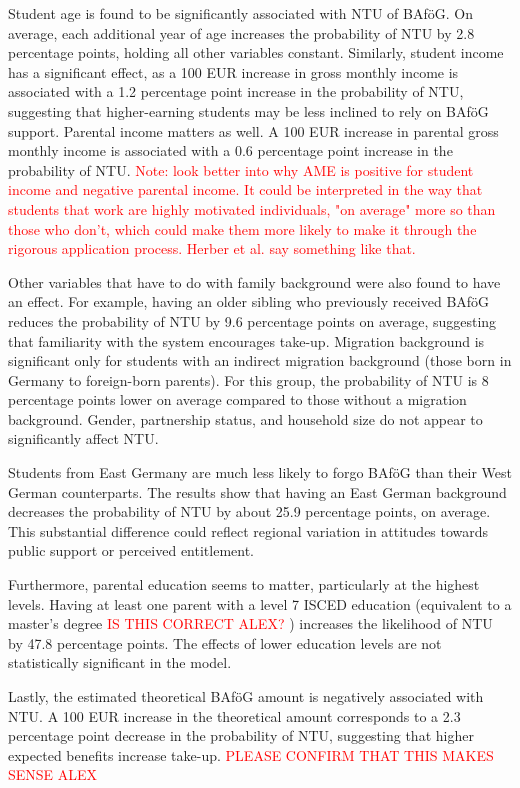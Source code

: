 Student age is found to be significantly associated with NTU of BAföG. On average, each additional year of age increases the probability of NTU by 2.8 percentage points, holding all other variables constant. Similarly, student income has a significant effect, as a 100 EUR increase in gross monthly income is associated with a 1.2 percentage point increase in the probability of NTU, suggesting that higher-earning students may be less inclined to rely on BAföG support. Parental income matters as well. A 100 EUR increase in parental gross monthly income is associated with a 0.6 percentage point increase in the probability of NTU. \textcolor{red}{Note: look better into why AME is positive for student income and negative parental income. It could be interpreted in the way that students that work are highly motivated individuals, "on average" more so than those who don't, which could make them more likely to make it through the rigorous application process. Herber et al. say something like that.}

Other variables that have to do with family background were also found to have an effect. For example, having an older sibling who previously received BAföG reduces the probability of NTU by 9.6 percentage points on average, suggesting that familiarity with the system encourages take-up. Migration background is significant only for students with an indirect migration background (those born in Germany to foreign-born parents). For this group, the probability of NTU is 8 percentage points lower on average compared to those without a migration background.  Gender, partnership status, and household size do not appear to significantly affect NTU.

Students from East Germany are much less likely to forgo BAföG than their West German counterparts. The results show that having an East German background decreases the probability of NTU by about 25.9 percentage points, on average. This substantial difference could reflect regional variation in attitudes towards public support or perceived entitlement.

Furthermore, parental education seems to matter, particularly at the highest levels. Having at least one parent with a level 7 ISCED education (equivalent to a master’s degree \textcolor{red}{IS THIS CORRECT ALEX?}
) increases the likelihood of NTU by 47.8 percentage points. The effects of lower education levels are not statistically significant in the model.

Lastly, the estimated theoretical BAföG amount is negatively associated with NTU. A 100 EUR increase in the theoretical amount corresponds to a 2.3 percentage point decrease in the probability of NTU, suggesting that higher expected benefits increase take-up. \textcolor{red}{PLEASE CONFIRM THAT THIS MAKES SENSE ALEX}


